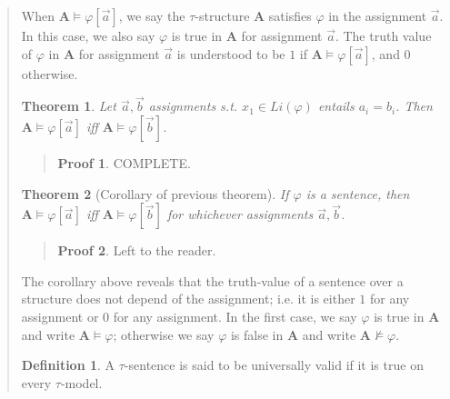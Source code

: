 \documentclass[a4paper, 12pt]{article}
\newtheorem{theorem}{Theorem}
\theoremstyle{definition}
\theoremstyle{definition}
\theoremstyle{definition}
\newtheorem{definition}{Definition}
\newtheorem{pro}{Proof}
\begin{document}
\begin{quote}
When $\textbf{A} \vDash \varphi[\overrightarrow{a}]$, we say the
$\tau$-structure $\textbf{A}$ satisfies $\varphi$ in the assignment
$\overrightarrow{a}$. In this case, we also say $\varphi$ is true in
$\textbf{A}$ for assignment $\overrightarrow{a}$. The truth value of $\varphi$
in $\textbf{A}$ for assignment $\overrightarrow{a}$ is understood to be $1$ if
$\textbf{A}\vDash \varphi [\overrightarrow{a}]$, and $0$ otherwise.

\begin{theorem}
    Let $\overrightarrow{a}, \overrightarrow{b}$ assignments s.t. $x_1 \in Li(\varphi)$
    entails $a_i = b_i$. Then $\textbf{A} \vDash \varphi [\overrightarrow{a}]$ iff 
    $\textbf{A} \vDash \varphi [\overrightarrow{b}]$.
\end{theorem}


\small
\begin{quote}

\begin{pro}
    COMPLETE.
\end{pro}

\end{quote}
\normalsize

\begin{theorem}[Corollary of previous theorem]
    If $\varphi$ is a sentence, then $\textbf{A} \vDash \varphi [\overrightarrow{a}]$ iff 
    $\textbf{A} \vDash \varphi [\overrightarrow{b}]$ for whichever 
    assignments $\overrightarrow{a}, \overrightarrow{b}$.
\end{theorem}


\small
\begin{quote}

\begin{pro}
    Left to the reader.
\end{pro}

\end{quote}
\normalsize

The corollary above reveals that the truth-value of a sentence over a structure
does not depend of the assignment; i.e. it is either $1$ for any assignment or
$0$ for any assignment. In the first case, we say $\varphi$ is true in
$\textbf{A}$ and write $\textbf{A} \vDash \varphi$; otherwise we say $\varphi$
is false in $\textbf{A}$ and write $\textbf{A} \not\vDash \varphi$.

\begin{definition}
    A $\tau$-sentence is said to be universally valid if it is true on every $\tau$-model.
\end{definition}


\end{quote}
\end{document}
